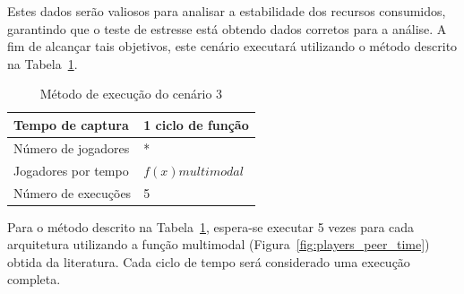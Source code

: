 Estes dados serão valiosos para analisar a estabilidade dos recursos consumidos, garantindo que o teste de estresse está obtendo dados corretos para a análise.
%
A fim de alcançar tais objetivos, este cenário executará utilizando o método descrito na Tabela~\ref{tab:cenario_3}.

\begin{table}[htb!]
\centering
\caption{Método de execução do cenário 3}
\label{tab:cenario_3}
\begin{tabular}{|l|l|}
\hline
Tempo de captura    &  1 ciclo de função \\ \hline
Número de jogadores & *                 \\ \hline
Jogadores por tempo & $f(x) multimodal$ \\ \hline
Número de execuções & 5                 \\ \hline
\end{tabular}
\end{table}

Para o método descrito na Tabela~\ref{tab:cenario_3}, espera-se executar 5 vezes para cada arquitetura utilizando a função multimodal (Figura~\ref{fig:players_peer_time}) obtida da literatura.
Cada ciclo de tempo será considerado uma execução completa.


%
